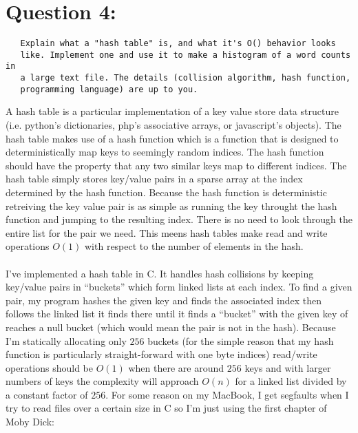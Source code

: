 \documentclass[11pt]{article}
\begin{document}
\section*{Question 4:}
\label{sec-4}

  
\begin{verbatim}
   Explain what a "hash table" is, and what it's O() behavior looks
   like. Implement one and use it to make a histogram of a word counts in
   a large text file. The details (collision algorithm, hash function,
   programming language) are up to you.
\end{verbatim}

  
  \noindent
  A hash table is a particular implementation of a key value store
  data structure (i.e. python's dictionaries, php's associative
  arrays, or javascript's objects).  The hash table makes use of a
  hash function which is a function that is designed to
  deterministically map keys to seemingly random indices.  The hash
  function should have the property that any two similar keys map to
  different indices.  The hash table simply stores key/value pairs in
  a sparse array at the index determined by the hash function.
  Because the hash function is deterministic retreiving the key value
  pair is as simple as running the key throught the hash function and
  jumping to the resulting index.  There is no need to look through
  the entire list for the pair we need.  This meens hash tables make
  read and write operations $O(1)$ with respect to the number of
  elements in the hash. \\
  \\
  \noindent
  I've implemented a hash table in C.  It handles hash collisions by
  keeping key/value pairs in ``buckets'' which form linked lists at each
  index.  To find a given pair, my program hashes the given key and
  finds the associated index then follows the linked list it finds
  there until it finds a ``bucket'' with the given key of reaches a null
  bucket (which would mean the pair is not in the hash).  Because I'm
  statically allocating only $256$ buckets (for the simple reason that
  my hash function is particularly straight-forward with one byte
  indices) read/write operations should be $O(1)$ when there are
  around $256$ keys and with larger numbers of keys the complexity
  will approach $O(n)$ for a linked list divided by a constant factor
  of $256$.  For some reason on my MacBook, I get segfaults when I try
  to read files over a certain size in C so I'm just using the first
  chapter of Moby Dick: \\ \\ \\
  
\end{document}
